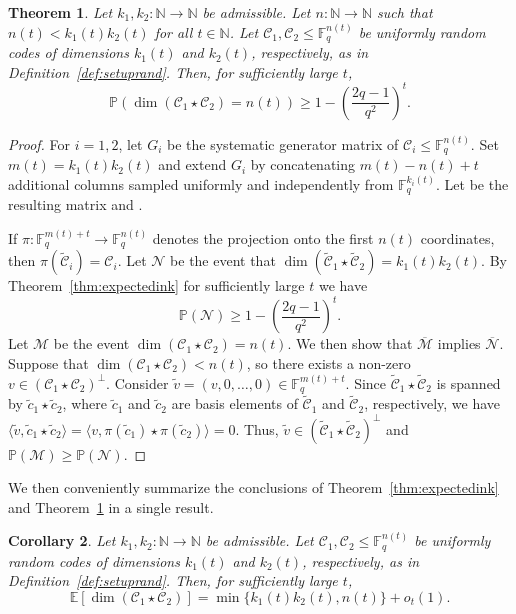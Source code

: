 \documentclass[a4paper,11pt,reqno]{article}
\newcommand{\F}{\mathbb{F}}
\newcommand{\C}{\mathcal{C}}
\newcommand{\rowsp}{\mathrm{rowsp}}
\theoremstyle{plain} \numberwithin{equation}{section}
\newtheorem{theorem}{Theorem}[section]
\newtheorem{corollary}[theorem]{Corollary}
\theoremstyle{definition}
\begin{document}
\begin{theorem} \label{thm:expectedink2}
Let $k_1,k_2\colon \mathbb{N}\rightarrow \mathbb{N}$ be admissible. Let $n\colon \mathbb{N}\rightarrow \mathbb{N}$ such that $n(t) < k_1(t)k_2(t)$ for all $t\in \mathbb{N}$. Let $\C_1, \C_2 \leq \F_q^{n(t)}$ be uniformly random codes of dimensions $k_1(t)$ and $k_2(t)$, respectively, as in Definition~\ref{def:setuprand}. Then, for sufficiently large $t$, 
\[
\mathbb{P}\left( \dim (\C_1\star\C_2) = n(t) \right) \geq 1 - \left(\frac{2q-1}{q^2}\right)^{t}.
\]
\end{theorem}
\begin{proof}
For $i=1,2$, let $G_i$ be the systematic generator matrix of $\C_i\leq \F_q^{n(t)}$. Set $m(t)=k_1(t)k_2(t)$ and extend $G_i$ by concatenating $m(t)-n(t)+t$ additional columns sampled uniformly and independently from $\F_q^{k_i(t)}$. Let \smash{$\tilde{G}_i\in \F_q^{k_i(t)\times (m(t)+t)}$} be the resulting matrix and \smash{$\tilde{\C}_i= \rowsp (\tilde{G}_i)$}.

If $\pi \colon \F_q^{m(t)+t}\rightarrow \F_q^{n(t)}$ denotes the projection onto the first $n(t)$ coordinates, then $\pi( \tilde{\C}_i) = \C_i$. Let $\mathcal{N}$ be the event that $\dim (\tilde{\C}_1 \star \tilde{\C}_2)=k_1(t)k_2(t)$. By Theorem~\ref{thm:expectedink} for sufficiently large $t$ we have
\[
    \mathbb{P}(\mathcal{N}) \geq 1 - \left( \frac{2q-1}{q^2}\right)^{t}.
\]
Let $\mathcal{M}$ be the event $\dim (\C_1\star\C_2) = n(t)$. We then show that $\overline{\mathcal{M}}$ implies $\overline{\mathcal{N}}$. Suppose that $\dim (\C_1\star\C_2) < n(t)$, so there exists a non-zero $v\in (\C_1\star \C_2)^\perp$. Consider $\tilde{v} =(v,0,\ldots,0)\in \F_q^{m(t)+t}$. Since $\tilde{\C}_1\star \tilde{\C}_2$ is spanned by $\tilde{c}_1\star \tilde{c}_2$, where $\tilde{c}_1$ and $\tilde{c}_2$ are basis elements of $\tilde{\C}_1$ and $\tilde{\C}_2$, respectively, we have
$
    \langle \tilde{v},\tilde{c}_1\star \tilde{c}_2\rangle = \langle v,\pi(\tilde{c}_1)\star \pi(\tilde{c}_2)\rangle =0.
$
Thus, $\tilde{v}\in (\tilde{\C}_1\star \tilde{\C}_2)^\perp$ and $\mathbb{P}(\mathcal{M}) \geq \mathbb{P}(\mathcal{N})$.
\end{proof}


We then conveniently summarize the conclusions of Theorem~\ref{thm:expectedink} and Theorem~\ref{thm:expectedink2} in a single result.
\begin{corollary} \label{cor:mainresult}Let $k_1,k_2\colon \mathbb{N}\rightarrow \mathbb{N}$ be admissible.  Let $\C_1, \C_2 \leq \F_q^{n(t)}$ be uniformly random codes of dimensions $k_1(t)$ and $k_2(t)$, respectively, as in Definition~\ref{def:setuprand}. Then, for sufficiently large $t$, 
\[
\mathbb{E}[\dim (\C_1\star\C_2)] = \min \{k_1(t)k_2(t),n(t)\} + o_t(1).
\]
\end{corollary}
\end{document}
